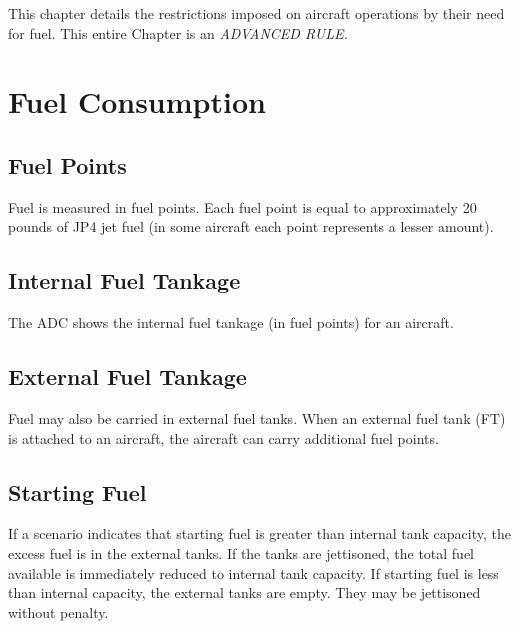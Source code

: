 

This chapter details the restrictions imposed on aircraft operations by their need for fuel. This entire Chapter is an \emph{ADVANCED RULE.}

\section{Fuel Consumption}
\label{rule:fuel-consumption}

\subsection{Fuel Points} Fuel is measured in fuel points. Each fuel point is equal to approximately 20 pounds of JP4 jet fuel (in some aircraft each point represents a lesser amount).

\subsection{Internal Fuel Tankage} The ADC shows the internal fuel tankage (in fuel points) for an aircraft.

\subsection{External Fuel Tankage} Fuel may also be carried in external fuel tanks. When an external fuel tank (FT) is attached to an aircraft, the aircraft can carry additional fuel points.


\subsection{Starting Fuel} If a scenario indicates that starting fuel is greater than internal tank capacity, the excess fuel is in the external tanks. If the tanks are jettisoned, the total fuel available is immediately reduced to internal tank capacity. If starting fuel is less than internal capacity, the external tanks are empty. They may be jettisoned without penalty.

